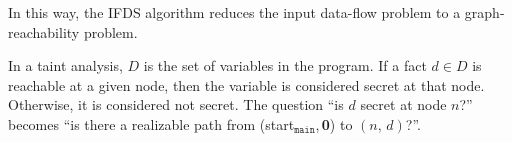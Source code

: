 In this way, the IFDS algorithm reduces the input data-flow problem to a graph-reachability problem.
\begin{example}
  In a taint analysis, $D$ is the set of variables in the program. If a fact $d\in D$ is reachable at a given node, then the variable is considered secret at that node. Otherwise, it is considered not secret. The question ``is $d$ secret at node $n$?'' becomes ``is there a realizable path from (\textsf{start}$_\texttt{main}$,\,\textbf{0}) to $(n,\,d)$?''.
\end{example}
